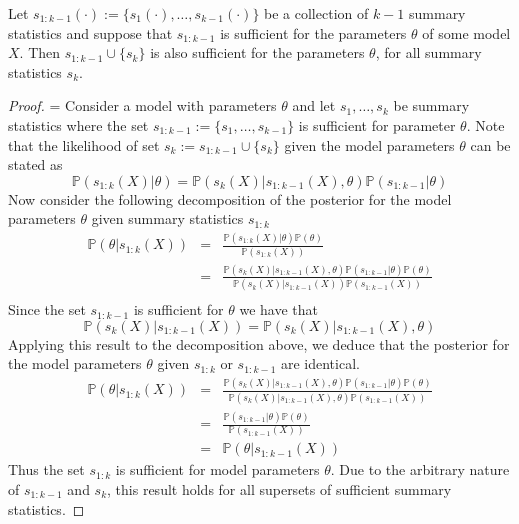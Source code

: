 \documentclass[bibliography=totoc,11pt,a4paper,margin=0]{article}
\newcommand*{\prob}{\mathbb{P}}
\theoremstyle{break}
\begin{document}
  \begin{box_remark}\label{the_sufficiency_of_superset}
    Let $s_{1:k-1}(\cdot):=\{s_1(\cdot),\dots,s_{k-1}(\cdot)\}$ be a collection of $k-1$ summary statistics and suppose that $s_{1:k-1}$ is sufficient for the parameters $\theta$ of some model $X$. Then $s_{1:k-1}\cup\{s_k\}$ is also sufficient for the parameters $\theta$, for all summary statistics $s_k$.
    \begin{proof}
      \everymath={\displaystyle}
      Consider a model with parameters $\theta$ and let $s_1,\dots,s_k$ be summary statistics where the set $s_{1:k-1}:=\{s_1,\dots,s_{k-1}\}$ is sufficient for parameter $\theta$. Note that the likelihood of set $s_k:=s_{1:k-1}\cup\{s_k\}$ given the model parameters $\theta$ can be stated as
      \[ \prob(s_{1:k}(X)|\theta)=\prob(s_k(X)|s_{1:k-1}(X),\theta)\prob(s_{1:k-1}|\theta) \]
      Now consider the following decomposition of the posterior for the model parameters $\theta$ given summary statistics $s_{1:k}$
      \[\begin{array}{rcl}
        \prob(\theta|s_{1:k}(X))&=&\frac{\prob(s_{1:k}(X)|\theta)\prob(\theta)}{\prob(s_{1:k}(X))}\\
        &=&\frac{\prob(s_k(X)|s_{1:k-1}(X),\theta)\prob(s_{1:k-1}|\theta)\prob(\theta)}{\prob(s_k(X)|s_{1:k-1}(X))\prob(s_{1:k-1}(X))}\\
      \end{array}\]
      Since the set $s_{1:k-1}$ is sufficient for $\theta$ we have that
      \[ \prob(s_k(X)|s_{1:k-1}(X))=\prob(s_k(X)|s_{1:k-1}(X),\theta)\]
      Applying this result to the decomposition above, we deduce that the posterior for the model parameters $\theta$ given $s_{1:k}$ or $s_{1:k-1}$ are identical.
      \[\begin{array}{rcl}
        \prob(\theta|s_{1:k}(X))&=&\frac{\prob(s_k(X)|s_{1:k-1}(X),\theta)\prob(s_{1:k-1}|\theta)\prob(\theta)}{\prob(s_k(X)|s_{1:k-1}(X),\theta)\prob(s_{1:k-1}(X))}\\
        &=&\frac{\prob(s_{1:k-1}|\theta)\prob(\theta)}{\prob(s_{1:k-1}(X))}\\
        &=&\prob(\theta|s_{1:k-1}(X))
      \end{array}\]
      Thus the set $s_{1:k}$ is sufficient for model parameters $\theta$. Due to the arbitrary nature of $s_{1:k-1}$ and $s_k$, this result holds for all supersets of sufficient summary statistics.
    \end{proof}
  \end{box_remark}
\end{document}

